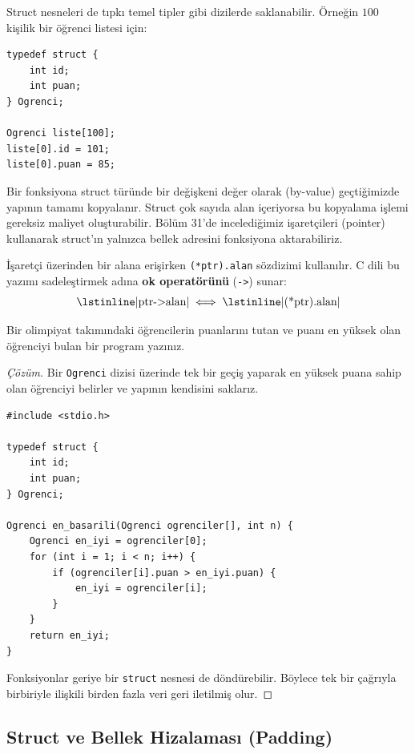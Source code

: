 Struct nesneleri de tıpkı temel tipler gibi dizilerde saklanabilir. Örneğin $100$ kişilik bir öğrenci listesi için:
\begin{lstlisting}[language=CTemel]
typedef struct {
    int id;
    int puan;
} Ogrenci;

Ogrenci liste[100];
liste[0].id = 101;
liste[0].puan = 85;
\end{lstlisting}

Bir fonksiyona struct türünde bir değişkeni değer olarak (by-value) geçtiğimizde yapının tamamı kopyalanır. Struct çok sayıda alan içeriyorsa bu kopyalama işlemi gereksiz maliyet oluşturabilir. Bölüm 31'de incelediğimiz işaretçileri (pointer) kullanarak struct'ın yalnızca bellek adresini fonksiyona aktarabiliriz.

İşaretçi üzerinden bir alana erişirken \lstinline|(*ptr).alan| sözdizimi kullanılır. C dili bu yazımı sadeleştirmek adına \textbf{ok operatörünü} (\lstinline|->|) sunar:
\[
\text{\lstinline|ptr->alan|} \iff \text{\lstinline|(*ptr).alan|}
\]

\begin{example}
Bir olimpiyat takımındaki öğrencilerin puanlarını tutan ve puanı en yüksek olan öğrenciyi bulan bir program yazınız.
\end{example}

\begin{proof}[Çözüm]
Bir \lstinline|Ogrenci| dizisi üzerinde tek bir geçiş yaparak en yüksek puana sahip olan öğrenciyi belirler ve yapının kendisini saklarız.

\begin{lstlisting}[language=CTemel]
#include <stdio.h>

typedef struct {
    int id;
    int puan;
} Ogrenci;

Ogrenci en_basarili(Ogrenci ogrenciler[], int n) {
    Ogrenci en_iyi = ogrenciler[0];
    for (int i = 1; i < n; i++) {
        if (ogrenciler[i].puan > en_iyi.puan) {
            en_iyi = ogrenciler[i];
        }
    }
    return en_iyi;
}
\end{lstlisting}
Fonksiyonlar geriye bir \lstinline|struct| nesnesi de döndürebilir. Böylece tek bir çağrıyla birbiriyle ilişkili birden fazla veri geri iletilmiş olur.
\end{proof}

\subsection{Struct ve Bellek Hizalaması (Padding)}

